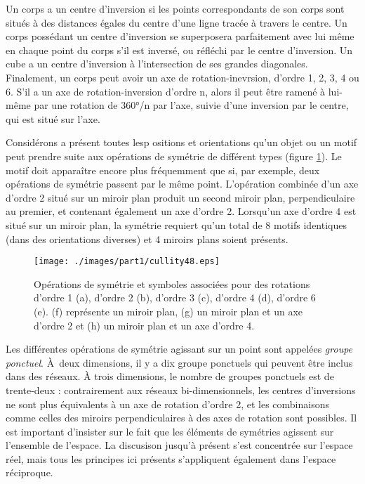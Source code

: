 Un corps a un centre d'inversion si les points correspondants de son corps sont
situés à des distances égales du centre d'une ligne tracée à travers le centre.
Un corps possédant un centre d'inversion se superposera parfaitement avec lui
même en chaque point du corps s'il est inversé, ou réfléchi par le centre
d'inversion. Un cube a un centre d'inversion à l'intersection de ses grandes
diagonales.
Finalement, un corps peut avoir un axe de rotation-inevrsion, d'ordre 1, 2, 3, 4
ou 6. S'il a un axe de rotation-inversion d'ordre n, alors il peut être ramené à
lui-même par une rotation de 360°/n par l'axe, suivie d'une inversion par le
centre, qui est situé sur l'axe.

Considérons a présent toutes lesp ositions et orientations qu'un objet ou un
motif peut prendre suite aux opérations de symétrie de différent types (figure
\ref{cullity9}). Le motif doit apparaître encore plus fréquemment que si, par
exemple, deux opérations de symétrie passent par le même point. L'opération
combinée d'un axe d'ordre 2 situé sur un miroir plan produit un second miroir
plan, perpendiculaire au premier, et contenant également un axe d'ordre 2.
Lorsqu'un axe d'ordre 4 est situé sur un miroir plan, la symétrie requiert qu'un
total de 8 motifs identiques (dans des orientations diverses) et 4 miroirs plans
soient présents.

\begin{figure}
    \texttt{[image: ./images/part1/cullity48.eps]}
    \caption{Opérations de symétrie et symboles associées pour des rotations
        d'ordre 1 (a), d'ordre 2 (b), d'ordre 3 (c), d'ordre 4 (d), d'ordre 6
        (e). (f) représente un miroir plan, (g) un miroir plan et un axe d'ordre
    2 et (h) un miroir plan et un axe d'ordre 4.}
    \label{cullity9}
\end{figure}

Les différentes opérations de symétrie agissant sur un point sont appelées
\emph{groupe ponctuel}. À deux dimensions, il y a dix groupe ponctuels qui
peuvent être inclus dans des réseaux. À trois dimensions, le nombre de groupes
ponctuels est de trente-deux : contrairement aux réseaux bi-dimensionnels, les
centres d'inversions ne sont plus équivalents à un axe de rotation d'ordre 2, et
les combinaisons comme celles des miroirs perpendiculaires à des axes de rotation
sont possibles.
Il est important d'insister sur le fait que les éléments de symétries agissent
sur l'ensemble de l'espace. La discusison jusqu'à présent s'est concentrée sur
l'espace réel, mais tous les principes ici présents s'appliquent également dans
l'espace réciproque.

